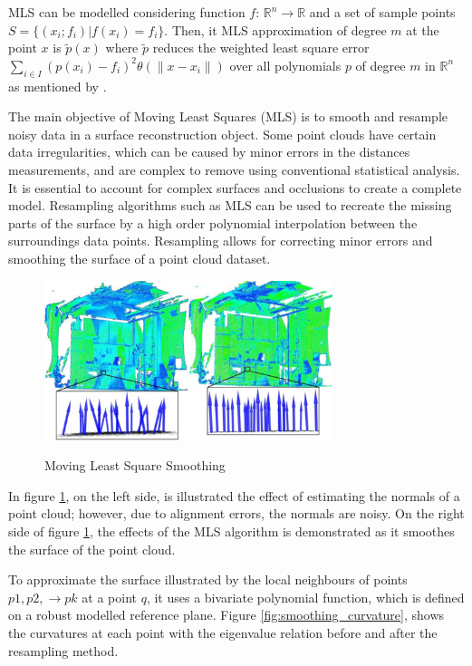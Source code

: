 \documentclass[12pt]{report}
\begin{document}
MLS can be modelled considering function $f$: $\mathbb{R}^n \rightarrow \mathbb{R}$ and a set of sample points $S = \{ ( x_i ; f_i ) | f(x_i) = f_i\} $.
Then, it MLS approximation of degree $m$ at the point $x$ is $\tilde{p} (x)$ where $\tilde{p}$ reduces the weighted least square error
$\sum_{i \in I} (p(x_i)-f_i)^2 \theta (\| x-x_i\| )$ over all polynomials $p$ of degree $m$ in $\mathbb{R}^n$ as mentioned by .

The main objective of Moving Least Squares (MLS) is to smooth and resample noisy data in a surface reconstruction object.
Some point clouds have certain data irregularities, which can be caused by minor errors in the distances measurements, and are complex to remove using conventional
statistical analysis. It is essential to account for complex surfaces and occlusions to create a complete model. Resampling algorithms such as MLS can be used to 
recreate the missing parts of the surface by a high order polynomial interpolation between the surroundings data points.
Resampling allows for correcting minor errors and smoothing the surface of a point cloud dataset. 
\enlargethispage{\baselineskip}

\begin{figure}[H]%
  \centering
  \includegraphics[width=0.75\textwidth]{resampling_1.jpg}
 \caption{Moving Least Square Smoothing}\cite[]{Rusu_ICRA2011_PCL}
 \label{fig:smoothing_mls} 
\end{figure}

In figure \ref{fig:smoothing_mls}, on the left side,  is illustrated the effect of estimating the normals of a point cloud; however, due to alignment errors,
the normals are noisy. On the right side of figure \ref{fig:smoothing_mls}, the effects of the MLS algorithm is demonstrated as it smoothes the surface of the point cloud.

To approximate the surface illustrated by the local neighbours of points $p1,p2,\rightarrow pk$ at a point $q$, it uses a bivariate polynomial function, which is defined on a robust modelled reference plane.
Figure \ref{fig:smoothing_curvature}, shows the curvatures at each point with the eigenvalue relation before and after the resampling method. 
\end{document}
